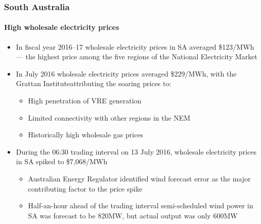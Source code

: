 \documentclass[presentation, smaller, table, svgnames]{beamer}
\begin{document}
\begin{frame}
	\frametitle{South Australia}
	\framesubtitle{High wholesale electricity prices}

	\begin{itemize}
		\item  In fiscal year 2016--17 wholesale electricity prices in SA averaged \$123/MWh --- the highest price among the five regions of the National Electricity Market
		
		\item  In July 2016 wholesale electricity prices averaged \$229/MWh, with the Grattan Institute\footnotemark[2] attributing the soaring prices to:
		\begin{itemize}
			\item  High penetration of VRE generation
			\item  Limited connectivity with other regions in the NEM
			\item  Historically high wholesale gas prices
		\end{itemize}
		
		\item  During the 06:30 trading interval on 13 July 2016, wholesale electricity prices in SA spiked to \$7,068/MWh
		\begin{itemize}
			\item  Australian Energy Regulator identified wind forecast error as the major contributing factor to the price spike
			\item  Half-an-hour ahead of the trading interval semi-scheduled wind power in SA was forecast to be 820MW, but actual output was only 600MW
		\end{itemize}
		
	\end{itemize}

\footnotesize{
\par
}

\end{frame}
\end{document}
